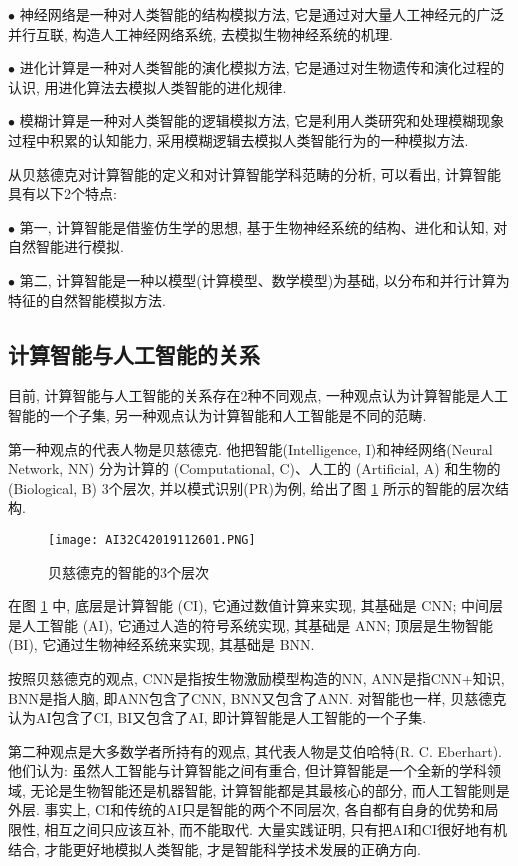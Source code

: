$\bullet$ 神经网络是一种对人类智能的结构模拟方法, 它是通过对大量人工神经元的广泛并行互联, 构造人工神经网络系统, 去模拟生物神经系统的机理.

$\bullet$ 进化计算是一种对人类智能的演化模拟方法, 它是通过对生物遗传和演化过程的认识, 用进化算法去模拟人类智能的进化规律.

$\bullet$ 模糊计算是一种对人类智能的逻辑模拟方法, 它是利用人类研究和处理模糊现象过程中积累的认知能力, 采用模糊逻辑去模拟人类智能行为的一种模拟方法.

\begin{remark}
从贝慈德克对计算智能的定义和对计算智能学科范畴的分析, 可以看出, 计算智能具有以下2个特点:

$\bullet$ 第一, 计算智能是借鉴仿生学的思想, 基于生物神经系统的结构、进化和认知, 对自然智能进行模拟.

$\bullet$ 第二, 计算智能是一种以模型(计算模型、数学模型)为基础, 以分布和并行计算为特征的自然智能模拟方法.
\end{remark}
\subsection{计算智能与人工智能的关系}
目前, 计算智能与人工智能的关系存在2种不同观点, 一种观点认为计算智能是人工智能的一个子集, 另一种观点认为计算智能和人工智能是不同的范畴.

第一种观点的代表人物是贝慈德克. 他把智能(Intelligence, I)和神经网络(Neural Network, NN) 分为计算的 (Computational, C)、人工的 (Artificial, A) 和生物的 (Biological, B) 3个层次, 并以模式识别(PR)为例, 给出了图 \ref{AI32fig26000001} 所示的智能的层次结构.
\begin{figure}[H]
    \centering
    \texttt{[image: AI32C42019112601.PNG]}
    \vspace{-0.4cm}
    \caption{贝慈德克的智能的3个层次}
    \label{AI32fig26000001}
\end{figure}
在图 \ref{AI32fig26000001} 中, 底层是计算智能 (CI), 它通过数值计算来实现, 其基础是 CNN; 中间层是人工智能 (AI), 它通过人造的符号系统实现, 其基础是 ANN; 顶层是生物智能 (BI), 它通过生物神经系统来实现, 其基础是 BNN.

按照贝慈德克的观点, CNN是指按生物激励模型构造的NN, ANN是指CNN+知识, BNN是指人脑, 即ANN包含了CNN, BNN又包含了ANN. 对智能也一样, 贝慈德克认为AI包含了CI, BI又包含了AI, 即计算智能是人工智能的一个子集.

第二种观点是大多数学者所持有的观点, 其代表人物是艾伯哈特(R. C. Eberhart). 他们认为: 虽然人工智能与计算智能之间有重合, 但计算智能是一个全新的学科领域, 无论是生物智能还是机器智能, 计算智能都是其最核心的部分, 而人工智能则是外层.
事实上, CI和传统的AI只是智能的两个不同层次, 各自都有自身的优势和局限性, 相互之间只应该互补, 而不能取代.
大量实践证明, 只有把AI和CI很好地有机结合, 才能更好地模拟人类智能, 才是智能科学技术发展的正确方向.
